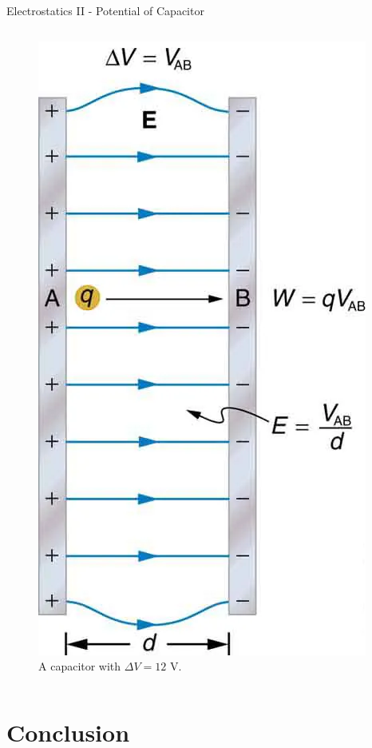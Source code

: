 \documentclass{beamer}
\begin{document}
\begin{frame}{Electrostatics II - Potential of Capacitor}
\begin{columns}[T]
\begin{column}{0.275\textwidth}
\begin{figure}
\includegraphics[width=\textwidth]{figures/cap2.png}
\caption{\label{fig:cap4} A capacitor with $\Delta V = 12$ V.}
\end{figure}
\end{column}
\end{columns}
\end{frame}

\section{Conclusion}
\end{document}
